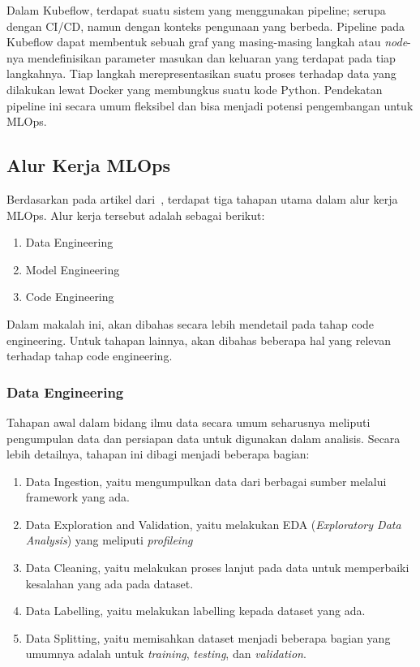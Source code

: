 Dalam Kubeflow, terdapat suatu sistem yang menggunakan pipeline; serupa dengan CI/CD, namun dengan konteks pengunaan yang berbeda.
Pipeline pada Kubeflow dapat membentuk sebuah graf yang masing-masing langkah atau \textit{node}-nya mendefinisikan parameter masukan dan keluaran yang terdapat pada tiap langkahnya.
Tiap langkah merepresentasikan suatu proses terhadap data yang dilakukan lewat Docker yang membungkus suatu kode Python.
Pendekatan pipeline ini secara umum fleksibel dan bisa menjadi potensi pengembangan untuk MLOps.

\subsection{Alur Kerja MLOps}

Berdasarkan pada artikel dari~\cite{mlopsorg}, terdapat tiga tahapan utama dalam alur kerja MLOps.
Alur kerja tersebut adalah sebagai berikut:
\begin{enumerate}
  \item Data Engineering
  \item Model Engineering
  \item Code Engineering
\end{enumerate}

Dalam makalah ini, akan dibahas secara lebih mendetail pada tahap code engineering.
Untuk tahapan lainnya, akan dibahas beberapa hal yang relevan terhadap tahap code engineering.

\subsubsection{Data Engineering}

Tahapan awal dalam bidang ilmu data secara umum seharusnya meliputi pengumpulan data dan persiapan data untuk digunakan dalam analisis.
Secara lebih detailnya, tahapan ini dibagi menjadi beberapa bagian:
\begin{enumerate}
  \item Data Ingestion, yaitu mengumpulkan data dari berbagai sumber melalui framework yang ada. 
  \item Data Exploration and Validation, yaitu melakukan EDA (\textit{Exploratory Data Analysis}) yang meliputi \textit{profileing}
  \item Data Cleaning, yaitu melakukan proses lanjut pada data untuk memperbaiki kesalahan yang ada pada dataset.
  \item Data Labelling, yaitu melakukan labelling kepada dataset yang ada.
  \item Data Splitting, yaitu memisahkan dataset menjadi beberapa bagian yang umumnya adalah untuk \textit{training}, \textit{testing}, dan \textit{validation}.
\end{enumerate}

